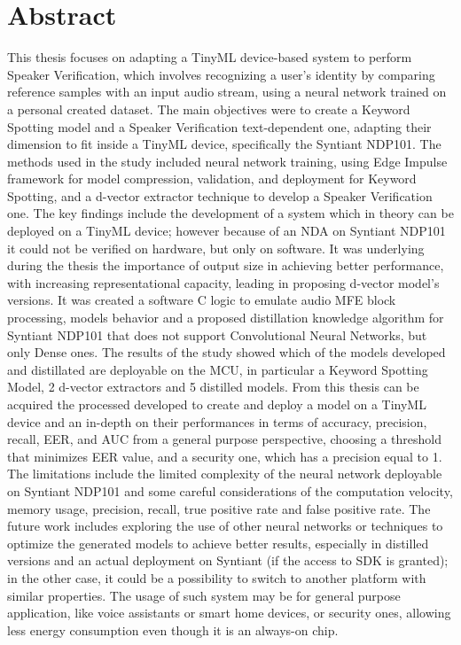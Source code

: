\chapter*{Abstract} %
\label{abtract}
This thesis focuses on adapting a TinyML device-based system to perform Speaker Verification, which involves recognizing a user's identity by comparing reference samples with an input audio stream, using a neural network trained on a personal created dataset. The main objectives were to create a Keyword Spotting model and a Speaker Verification text-dependent one, adapting their dimension to fit inside a TinyML device, specifically the Syntiant NDP101. The methods used in the study included neural network training, using Edge Impulse framework for model compression, validation, and deployment for Keyword Spotting, and a d-vector extractor technique to develop a Speaker Verification one. The key findings include the development of a system which in theory can be deployed on a TinyML device; however because of an NDA on Syntiant NDP101 it could not be verified on hardware, but only on software. It was underlying during the thesis the importance of output size in achieving better performance, with increasing representational capacity, leading in proposing d-vector model's versions. It was created a software C logic to emulate audio MFE block processing, models behavior and a proposed distillation knowledge algorithm for Syntiant NDP101 that does not support Convolutional Neural Networks, but only Dense ones. The results of the study showed which of the models developed and distillated are deployable on the MCU, in particular a Keyword Spotting Model, 2 d-vector extractors and 5 distilled models. From this thesis can be acquired the processed developed to create and deploy a model on a TinyML device and an in-depth on their performances in terms of accuracy, precision, recall, EER, and AUC from a general purpose perspective, choosing a threshold that minimizes EER value, and a security one, which has a precision equal to 1. 
The limitations include the limited complexity of the neural network deployable on Syntiant NDP101 and some careful considerations of the computation velocity, memory usage, precision, recall, true positive rate and false positive rate. The future work includes exploring the use of other neural networks or techniques to optimize the generated models to achieve better results, especially in distilled versions and an actual deployment on Syntiant (if the access to SDK is granted); in the other case, it could be a possibility to switch to another platform with similar properties. The usage of such system may be for general purpose application, like voice assistants or smart home devices, or security ones, allowing less energy consumption even though it is an always-on chip.\newline\newline
\newpage